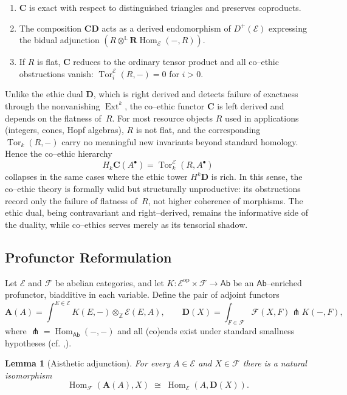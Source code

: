 \documentclass[12pt]{article}
\DeclareMathOperator{\Tor}{Tor}
\newcommand{\E}{\mathcal{E}}
\newcommand{\F}{\mathcal{F}}
\newcommand{\Ab}{\mathsf{Ab}}
\newcommand{\ZZ}{\mathbb{Z}}
\newcommand{\Hom}{\operatorname{Hom}}
\newcommand{\Ext}{\operatorname{Ext}}
\newcommand{\op}{\mathrm{op}}
\newcommand{\RHom}{\mathbf{R}\!\operatorname{Hom}}
\theoremstyle{plain}
\newtheorem{lemma}[theorem]{Lemma}
\theoremstyle{definition}
\theoremstyle{remark}
\numberwithin{equation}{section}
\begin{document}
\begin{enumerate}[label=(\alph*)]
\item $\mathbf C$ is exact with respect to distinguished triangles and
preserves coproducts.
\item The composition $\mathbf C\mathbf D$ acts as a derived
endomorphism of $D^+(\E)$ expressing the bidual adjunction
$(R\!\otimes^{\mathbb L}\RHom_\E(-,R))$.
\item If $R$ is flat, $\mathbf C$ reduces to the ordinary tensor product and
all co--ethic obstructions vanish: $\Tor_i^\E(R,-)=0$ for $i>0$.
\end{enumerate}

Unlike the ethic dual $\mathbf D$, which is right derived and
detects failure of exactness through the nonvanishing $\Ext^k$,
the co--ethic functor $\mathbf C$ is left derived and
depends on the flatness of~$R$.
For most resource objects $R$ used in applications
(integers, cones, Hopf algebras), $R$ is not flat,
and the corresponding $\Tor_k(R,-)$
carry no meaningful new invariants beyond standard homology.
Hence the co--ethic hierarchy
\[
H_k\mathbf C(A^\bullet)=\Tor_k^\E(R,A^\bullet)
\]
collapses in the same cases where the ethic tower $H^k\mathbf D$ is rich.
In this sense, the co--ethic theory is formally valid but
structurally unproductive:
its obstructions record only the failure of flatness of~$R$,
not higher coherence of morphisms.
The ethic dual, being contravariant and right--derived, remains the
informative side of the duality, while co--ethics serves merely as its
tensorial shadow.

\subsection{Profunctor Reformulation}

Let $\E$ and $\F$ be abelian categories, and let $K:\E^{\op}\times\F\to\Ab$ be an $\Ab$–enriched profunctor, biadditive in each variable. Define the pair of adjoint functors
\[
\mathbf A(A)=\int^{E\in\E}K(E,-)\otimes_\ZZ \E(E,A),
\qquad
\mathbf D(X)=\int_{F\in\F}\F(X,F)\pitchfork K(-,F),
\]
where $\pitchfork=\Hom_\Ab(-,-)$ and all (co)ends exist under standard smallness hypotheses (cf. \cite{MacLane1998},\cite{Kelly1982}). 

\begin{lemma}[Aisthetic adjunction]\label{lem:aisthetic-adjunction}
For every $A\in\E$ and $X\in\F$ there is a natural isomorphism
\[
\Hom_\F(\mathbf A(A),X)\;\cong\;\Hom_\E(A,\mathbf D(X)).
\]
\end{lemma}
\end{document}
